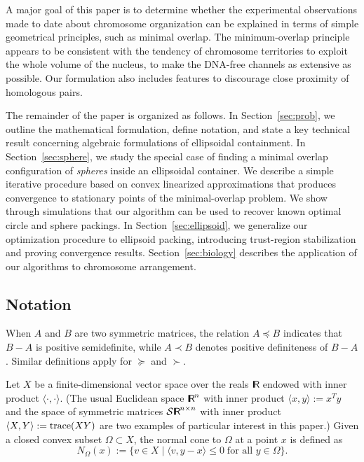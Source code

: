 \documentclass{siamltex}
\begin{document}
A major goal of this paper is to determine whether the experimental
observations made to date about chromosome organization can be
explained in terms of simple geometrical principles, such as minimal
overlap. The minimum-overlap principle appears to be consistent with
the tendency of chromosome territories to exploit the whole volume of
the nucleus, to make the DNA-free channels as extensive as
possible. Our formulation also includes features to discourage close
proximity of homologous pairs. 

The remainder of the paper is organized as follows.  In
Section~\ref{sec:prob}, we outline the mathematical formulation,
define notation, and state a key technical result concerning algebraic
formulations of ellipsoidal containment. In Section~\ref{sec:sphere},
we study the special case of finding a minimal overlap configuration
of {\em spheres} inside an ellipsoidal container. We describe a simple
iterative procedure based on convex linearized approximations that
produces convergence to stationary points of the minimal-overlap
problem.  We show through simulations that our algorithm can be used
to recover known optimal circle and sphere packings.  In
Section~\ref{sec:ellipsoid}, we generalize our optimization procedure
to ellipsoid packing, introducing trust-region stabilization and
proving convergence results.  Section~\ref{sec:biology} describes the
application of our algorithms to chromosome arrangement.

\subsection*{Notation} When $A$ and $B$ are two symmetric matrices,
the relation $A \preceq B$ indicates that $B-A$ is positive
semidefinite, while $A \prec B$ denotes positive definiteness of
$B-A$. Similar definitions apply for $\succeq$ and $\succ$.

Let $X$ be a finite-dimensional vector space over the reals ${\makebox{\sf I \hspace{-8.5 pt} R \hspace{-4.0pt}}}$
endowed with inner product $\langle \cdot, \cdot \rangle$. (The usual
Euclidean space ${\makebox{\sf I \hspace{-8.5 pt} R \hspace{-4.0pt}}}^n$ with inner product $\langle x,y \rangle :=
x^Ty$ and the space of symmetric matrices ${\cal S} {\makebox{\sf I \hspace{-8.5 pt} R \hspace{-4.0pt}}}^{n \times n}$
with inner product $\langle X,Y\rangle := {\mbox{\rm trace}} (XY)$ are two examples
of particular interest in this paper.) Given a closed convex subset
$\Omega \subset X$, the normal cone to $\Omega$ at a point $x$ is
defined as
\begin{equation} \label{def.normal}
N_{\Omega}(x) := \{ v \in X \mid \langle v,y-x \rangle \le 0 \; \mbox{for all $y \in \Omega$} \}.
\end{equation}
\end{document}
